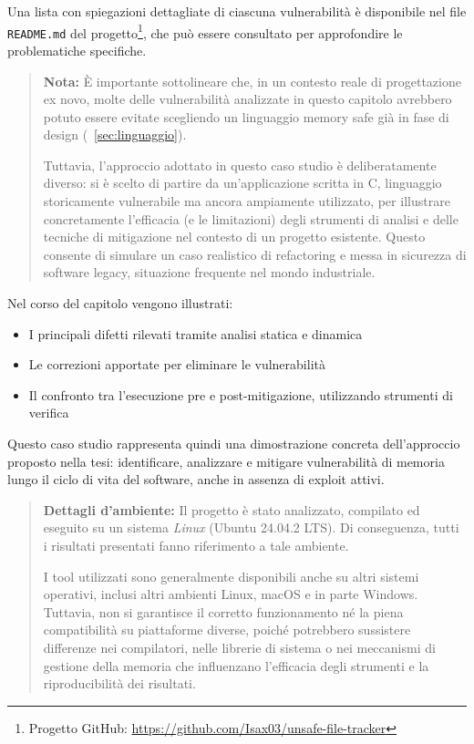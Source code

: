 Una lista con spiegazioni dettagliate di ciascuna vulnerabilità è disponibile nel
file \texttt{README.md} del progetto\footnote{Progetto GitHub: \url{https://github.com/Isax03/unsafe-file-tracker}},
che può essere consultato per approfondire le problematiche specifiche.

\begin{quote}
  \textbf{Nota:} È importante sottolineare che, in un contesto reale di progettazione
  ex novo, molte delle vulnerabilità analizzate in questo capitolo avrebbero
  potuto essere evitate scegliendo un linguaggio memory safe già in fase di
  design (~\autoref{sec:linguaggio}).

  Tuttavia, l'approccio adottato in questo caso studio è deliberatamente diverso:
  si è scelto di partire da un'applicazione scritta in C, linguaggio
  storicamente vulnerabile ma ancora ampiamente utilizzato, per illustrare concretamente
  l'efficacia (e le limitazioni) degli strumenti di analisi e delle tecniche di mitigazione
  nel contesto di un progetto esistente. Questo consente di simulare un caso
  realistico di refactoring e messa in sicurezza di software legacy, situazione frequente
  nel mondo industriale.
\end{quote}

Nel corso del capitolo vengono illustrati:
\begin{itemize}
  \item I principali difetti rilevati tramite analisi statica e dinamica

  \item Le correzioni apportate per eliminare le vulnerabilità

  \item Il confronto tra l'esecuzione pre e post-mitigazione, utilizzando
    strumenti di verifica
\end{itemize}

Questo caso studio rappresenta quindi una dimostrazione concreta dell'approccio
proposto nella tesi: identificare, analizzare e mitigare vulnerabilità di
memoria lungo il ciclo di vita del software, anche in assenza di exploit attivi.

\begin{quote}
  \textbf{Dettagli d'ambiente:} Il progetto è stato analizzato, compilato ed eseguito
  su un sistema \textit{Linux} (Ubuntu 24.04.2 LTS). Di conseguenza, tutti i risultati
  presentati fanno riferimento a tale ambiente.

  I tool utilizzati sono generalmente disponibili anche su altri sistemi operativi,
  inclusi altri ambienti Linux, macOS e in parte Windows. Tuttavia, non si garantisce
  il corretto funzionamento né la piena compatibilità su piattaforme diverse,
  poiché potrebbero sussistere differenze nei compilatori, nelle librerie di sistema
  o nei meccanismi di gestione della memoria che influenzano l'efficacia degli strumenti
  e la riproducibilità dei risultati.
\end{quote}




